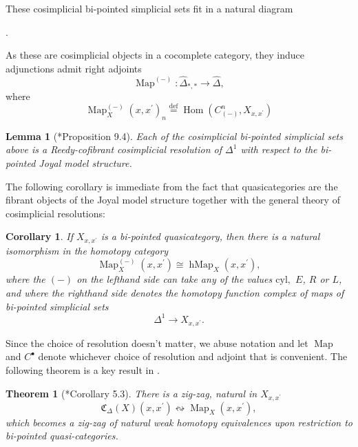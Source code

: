\documentclass[leqno]{article}
\numberwithin{equation}{subsection}
\theoremstyle{plain}   %
\newtheorem{thm}[equation]{Theorem}
\newtheorem{cor}[equation]{Corollary}
\newtheorem{lemma}[equation]{Lemma}
\theoremstyle{remark}
\theoremstyle{plain}
\DeclareMathOperator{\Map}{Map}
\DeclareMathOperator{\Hom}{Hom}
\newcommand{\psh}[1]{\ensuremath{\widehat{#1}}}
\newcommand{\defeq}{\overset{\mathrm{def}}=}
\begin{document}
These cosimplicial bi-pointed simplicial sets fit in a natural diagram
\begin{center}
	.
\end{center}
As these are cosimplicial objects in a cocomplete category, they induce adjunctions admit right adjoints
\[
	\operatorname{Map}^{(-)}: \psh{\Delta}_{\ast,\ast} \to \psh{\Delta},
\]
where
\[
	\operatorname{Map}^{(-)}_X(x,x^\prime)_n\defeq \Hom(C^n_{(-)},X_{x,x^\prime})
\]
\begin{lemma}[\cite{ds2}*{Proposition 9.4}]
	Each of the cosimplicial bi-pointed simplicial sets above is a Reedy-cofibrant cosimplicial resolution of \(\Delta^1\) with respect to the bi-pointed Joyal model structure. 
\end{lemma}
The following corollary is immediate from the fact that quasicategories are the fibrant objects of the Joyal model structure together with the general theory of cosimplicial resolutions:
\begin{cor}
	If \(X_{x,x^\prime}\) is a bi-pointed quasicategory, then there is a natural isomorphism in the homotopy category
	\[
		\operatorname{Map}^{(-)}_X(x,x^\prime)\cong \operatorname{hMap}_X(x,x^\prime),
	\]
	where the \((-)\) on the lefthand side can take any of the values \(\mathrm{cyl},\) \(E\), \(R\) or \(L\), and where the righthand side denotes the homotopy function complex of maps of bi-pointed simplicial sets
	\[
		\Delta^1 \to X_{x,x^\prime}.
	\]
\end{cor}
Since the choice of resolution doesn't matter, we abuse notation and let \(\Map\) and \(C^\bullet\) denote whichever choice of resolution and adjoint that is convenient.
The following theorem is a key result in \cite{ds2}.  
\begin{thm}[\cite{ds2}*{Corollary 5.3}]
	There is a zig-zag, natural in \(X_{x,x^\prime}\)
	\[
		\mathfrak{C}_\Delta(X)(x,x^\prime) \leftrightsquigarrow \Map_X(x,x^\prime),
	\]
	which becomes a zig-zag of natural weak homotopy equivalences upon restriction to bi-pointed quasi-categories.
\end{thm}
\end{document}
